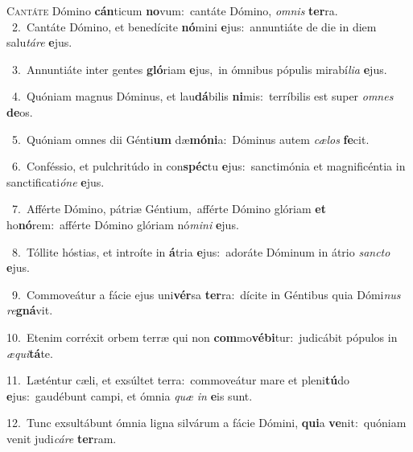 \lettrine{\initial\textcolor{\initialcolor}{C}}{antáte} Dómino \textbf{cán}\-ticum \textbf{no}\-vum:~\star cantáte Dómino, \textit{om}\-\textit{nis} \textbf{ter}\-ra.\\
{\numbfont\textcolor{\numbcolor}{~2.}}~Cantáte Dómino, et benedícite \textbf{nó}\-mini \textbf{e}\-jus:~\star annuntiáte de die in diem salu\-\textit{tá}\-\textit{re} \textbf{e}\-jus.\par
{\numbfont\textcolor{\numbcolor}{~3.}}~Annuntiáte inter gentes \textbf{gló}\-riam \textbf{e}\-jus,~\star in ómnibus pópulis mirabí\-\textit{li}\-\textit{a} \textbf{e}\-jus.\par
{\numbfont\textcolor{\numbcolor}{~4.}}~Quóniam magnus Dóminus, et lau\-\textbf{dá}\-bilis \textbf{ni}\-mis:~\star terríbilis est super \textit{om}\-\textit{nes} \textbf{de}\-os.\par
{\numbfont\textcolor{\numbcolor}{~5.}}~Quóniam omnes dii Génti\textbf{um} dæ\-\textbf{mó}\-\textbf{ni}a:~\star Dóminus autem \textit{cæ}\-\textit{los} \textbf{fe}\-cit.\par
{\numbfont\textcolor{\numbcolor}{~6.}}~Conféssio, et pulchritúdo in con\-\textbf{spéc}\-tu \textbf{e}\-jus:~\star sanctimónia et magnificéntia in sanctificati\-\textit{ó}\-\textit{ne} \textbf{e}\-jus.\par
{\numbfont\textcolor{\numbcolor}{~7.}}~Afférte Dómino, pátriæ Géntium,~\dagger afférte Dómino glóriam \textbf{et} ho\-\textbf{nó}\-rem:~\star afférte Dómino glóriam nó\-\textit{mi}\-\textit{ni} \textbf{e}\-jus.\par
{\numbfont\textcolor{\numbcolor}{~8.}}~Tóllite hóstias, et introíte in \textbf{á}\-tria \textbf{e}\-jus:~\star adoráte Dóminum in átrio \textit{sanc}\-\textit{to} \textbf{e}\-jus.\par
{\numbfont\textcolor{\numbcolor}{~9.}}~Commoveátur a fácie ejus uni\-\textbf{vér}\-sa \textbf{ter}\-ra:~\star dícite in Géntibus quia Dómi\textit{nus} \textit{re}\-\textbf{gná}vit.\par
{\numbfont\textcolor{\numbcolor}{10.}}~Etenim corréxit orbem terræ qui non \textbf{com}\-mo\-\textbf{vé}\-\textbf{bi}tur:~\star judicábit pópulos in \textit{æ}\-\textit{qui}\textbf{tá}te.\par
{\numbfont\textcolor{\numbcolor}{11.}}~Læténtur cæli, et exsúltet terra:~\dagger commoveátur mare et pleni\-\textbf{tú}\-do \textbf{e}\-jus:~\star gaudébunt campi, et ómnia \textit{quæ} \textit{in} \textbf{e}\-is sunt.\par
{\numbfont\textcolor{\numbcolor}{12.}}~Tunc exsultábunt ómnia ligna silvárum a fácie Dómini, \textbf{qui}\-a \textbf{ve}\-nit:~\star quóniam venit judi\-\textit{cá}\-\textit{re} \textbf{ter}\-ram.\par
